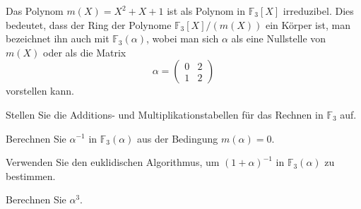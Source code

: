 Das Polynom $m(X)=X^2+X+1$ ist als Polynom in $\mathbb{F}_3[X]$ irreduzibel.
Dies bedeutet, dass der Ring der Polynome $\mathbb{F}_3[X] / (m(X))$ 
ein Körper ist, man bezeichnet ihn auch mit $\mathbb{F}_3(\alpha)$,
wobei man sich $\alpha$ als eine Nullstelle von $m(X)$
oder als die Matrix
\[
\alpha = \begin{pmatrix} 0&2\\1&2\end{pmatrix}
\]
vorstellen kann.
\begin{teilaufgaben}
\item 
Stellen Sie die Additions- und Multiplikationstabellen für das Rechnen
in $\mathbb{F}_3$ auf.
\item
Berechnen Sie $\alpha^{-1}$ in $\mathbb{F}_3(\alpha)$ aus der
Bedingung $m(\alpha)=0$.
\item
Verwenden Sie den euklidischen Algorithmus, um $(1+\alpha)^{-1}$
in $\mathbb{F}_3(\alpha)$ zu bestimmen.
\item
Berechnen Sie $\alpha^3$.
\end{teilaufgaben}

